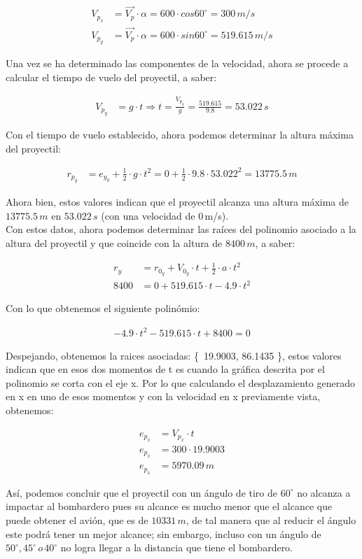 \documentclass[11pt,letterpaper]{article}
\begin{document}
\begin{align}
V_{p_{x}} &= \vec{V_{p}} \cdot \alpha = 600 \cdot cos 60^{\circ} = 300\,m/s\\
V_{p_{y}} &= \vec{V_{p}} \cdot \alpha = 600 \cdot sin 60^{\circ} = 519.615\,m/s
\end{align}

Una vez se ha determinado las componentes de la velocidad, ahora se procede a calcular el tiempo de vuelo del proyectil, a saber:

\begin{align}
V_{p_{y}} &= g \cdot t \Rightarrow t = \frac{V_{p_{y}}}{g} = \frac{519.615}{9.8} = 53.022\,s
\end{align}

Con el tiempo de vuelo establecido, ahora podemos determinar la altura máxima del proyectil:

\begin{align}
r_{p_{y}} &= e_{y_{0}} + \frac{1}{2} \cdot g \cdot t^2 = 0 + \frac{1}{2} \cdot 9.8 \cdot 53.022^2 = 13775.5\,m
\end{align}

Ahora bien, estos valores indican que el proyectil alcanza una altura máxima de $13775.5\,m$ en $53.022\,s$ (con una velocidad de 0\,m/s).\\

Con estos datos, ahora podemos determinar las raíces del polinomio asociado a la altura del proyectil y que coincide con la altura de $8400\,m$, a saber:

\begin{align}
r_{y} &= r_{0_{y}} + V_{0_{y}} \cdot t + \frac{1}{2} \cdot a \cdot t^2\\
8400 &= 0 + 519.615 \cdot t - 4.9 \cdot t^2
\end{align}

Con lo que obtenemos el siguiente polinómio:

\begin{align}
-4.9 \cdot t^2 - 519.615 \cdot t + 8400 = 0
\end{align}

Despejando, obtenemos la raices asociadas: \{ 19.9003, 86.1435 \}, estos valores indican que en esos dos momentos de t es cuando la gráfica descrita por el polinomio se corta con el eje x. Por lo que calculando el desplazamiento generado en x en uno de esos momentos y con la velocidad en x previamente vista, obtenemos:

\begin{align*}
e_{p_{x}} &= V_{p_{x}} \cdot t\\
e_{p_{x}} &= 300 \cdot 19.9003\\
e_{p_{x}} &= 5970.09\,m 
\end{align*}

Así, podemos concluir que el proyectil con un ángulo de tiro de $60^{\circ}$ no alcanza a impactar al bombardero pues su alcance es mucho menor que el alcance que puede obtener el avión, que es de $10331\,m$, de tal manera que al reducir el ángulo este podrá tener un mejor alcance; sin embargo, incluso con un ángulo de $50^{\circ}, 45^{\circ}\,o\,40^{\circ}$ no logra llegar a la distancia que tiene el bombardero.

\end{document}
